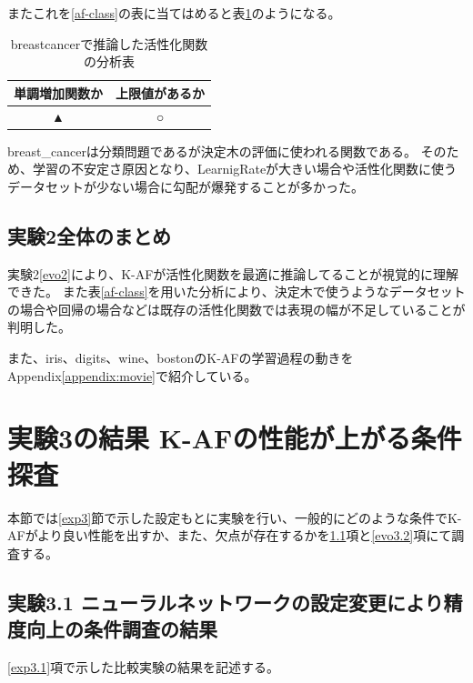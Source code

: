 またこれを\ref{af-class}の表に当てはめると表\ref{anal_breastcancer}のようになる。
\begin{table}[htbp]
    \begin{center}
        \caption{breastcancerで推論した活性化関数の分析表}
        \label{anal_breastcancer}
        \vspace{2mm} 
        \begin{tabular}{ |c|c| }
        \hline
        単調増加関数か  & 上限値があるか   \\
        \hline
        ▲ & ○   \\
        \hline
        \end{tabular}
    \end{center}
\end{table}


breast\_cancerは分類問題であるが決定木の評価に使われる関数である。
そのため、学習の不安定さ原因となり、LearnigRateが大きい場合や活性化関数に使うデータセットが少ない場合に勾配が爆発することが多かった。




\subsection{実験2全体のまとめ}
実験2\ref{evo2}により、K-AFが活性化関数を最適に推論してることが視覚的に理解できた。
また表\ref{af-class}を用いた分析により、決定木で使うようなデータセットの場合や回帰の場合などは既存の活性化関数では表現の幅が不足していることが判明した。

また、iris、digits、wine、bostonのK-AFの学習過程の動きをAppendix\ref{appendix:movie}で紹介している。









\section{実験3の結果 K-AFの性能が上がる条件探査}
\label{evo3}

本節では\ref{exp3}節で示した設定もとに実験を行い、一般的にどのような条件でK-AFがより良い性能を出すか、また、欠点が存在するかを\ref{evo3.1}項と\ref{evo3.2}項にて調査する。


\subsection{実験3.1 ニューラルネットワークの設定変更により精度向上の条件調査の結果}
\label{evo3.1}
\ref{exp3.1}項で示した比較実験の結果を記述する。


